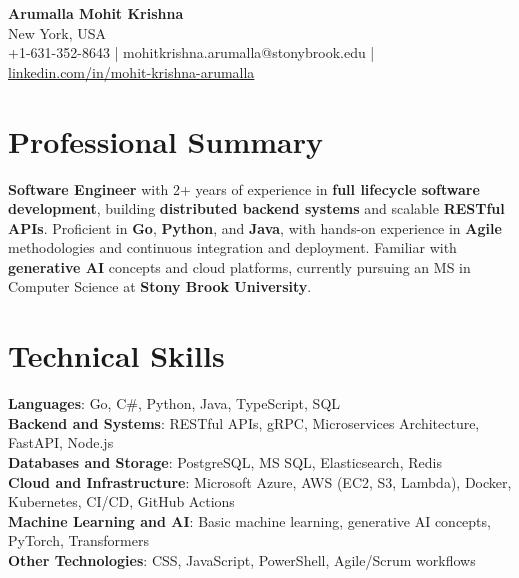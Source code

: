 \documentclass[letterpaper,11pt]{article}
\begin{document}
\begin{center}
  {\Large \textbf{Arumalla Mohit Krishna}} \\
  New York, USA \\
  +1-631-352-8643 \enspace | \enspace mohitkrishna.arumalla@stonybrook.edu \enspace | \enspace \href{https://www.linkedin.com/in/mohit-krishna-arumalla}{linkedin.com/in/mohit-krishna-arumalla}
\end{center}

\section{Professional Summary}
  \begin{itemize}[leftmargin=0.15in, label={}]
    \small{\item{
     \textbf{Software Engineer} with 2+ years of experience in \textbf{full lifecycle software development}, building \textbf{distributed backend systems} and scalable \textbf{RESTful APIs}. Proficient in \textbf{Go}, \textbf{Python}, and \textbf{Java}, with hands-on experience in \textbf{Agile} methodologies and continuous integration and deployment. Familiar with \textbf{generative AI} concepts and cloud platforms, currently pursuing an MS in Computer Science at \textbf{Stony Brook University}.
    }}
  \end{itemize}
\vspace{-16pt}

\section{Technical Skills}
 \begin{itemize}[leftmargin=0.15in, label={}]
    \small{\item{
     \textbf{Languages}: Go, C\#, Python, Java, TypeScript, SQL \\
     \textbf{Backend and Systems}: RESTful APIs, gRPC, Microservices Architecture, FastAPI, Node.js \\
     \textbf{Databases and Storage}: PostgreSQL, MS SQL, Elasticsearch, Redis \\
     \textbf{Cloud and Infrastructure}: Microsoft Azure, AWS (EC2, S3, Lambda), Docker, Kubernetes, CI/CD, GitHub Actions \\
     \textbf{Machine Learning and AI}: Basic machine learning, generative AI concepts, PyTorch, Transformers \\
     \textbf{Other Technologies}: CSS, JavaScript, PowerShell, Agile/Scrum workflows
    }}
 \end{itemize}
\vspace{-16pt}
\end{document}
